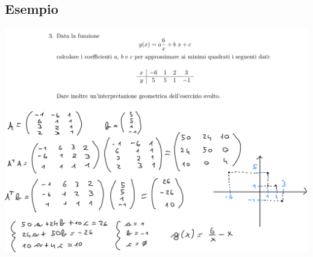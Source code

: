 \documentclass[10pt]{article}
\begin{document}
\subsection{Esempio}
\begin{center}
    \includegraphics[scale=0.4]{es3pt2.png}
\end{center}
\end{document}
